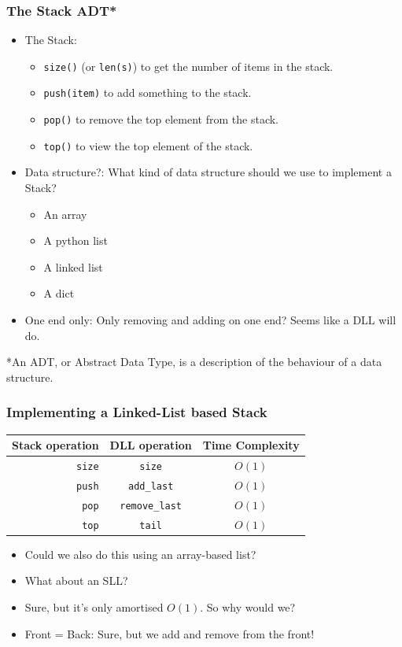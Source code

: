 \begin{frame}
	\frametitle{The Stack ADT*}
		\begin{itemize}
			\item The Stack:
				\begin{itemize}
					\item \texttt{size()} (or \texttt{len(s)}) to get the number of items in the stack.
					\item \texttt{push(item)} to add something to the stack.
						
					\item \texttt{pop()} to remove the top element from the stack.
					\item \texttt{top()} to view the top element of the stack.
				\end{itemize}
			\item Data structure?: 
				What kind of data structure should we use to implement a Stack?

				\begin{itemize}
					\item An array
					\item A python list
					\item A linked list
					\item A dict
				\end{itemize}
			\item One end only:
				Only removing and adding on one end? Seems like a DLL will do.
			\end{itemize}

						{*\scriptsize An ADT, or Abstract Data Type, is a description of the behaviour of a data structure.}
\end{frame}

\begin{frame}
	\frametitle{Implementing a Linked-List based Stack}
			\begin{tabular}{r | c c}
				Stack operation & DLL operation & Time Complexity \\
				\midrule
				\texttt{size} & \texttt{size} & $O(1)$ \\
				\texttt{push} & \texttt{add\_last} & $O(1)$ \\
				\texttt{pop}  & \texttt{remove\_last} & $O(1)$ \\
				\texttt{top}  & \texttt{tail} & $O(1)$ \\
			\end{tabular}
		
				\begin{itemize}
					\item Could we also do this using an array-based list?	
					\item What about an SLL?
					\item Sure, but it's only amortised $O(1)$. So why would we?
					\item Front = Back: Sure, but we add and remove from the front!
			\end{itemize}

\end{frame}

